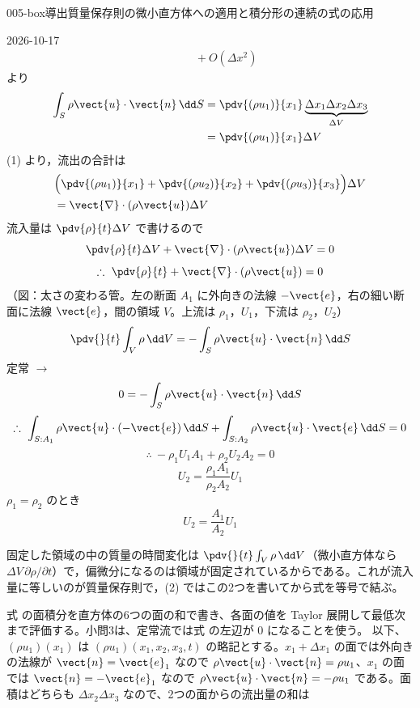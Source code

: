 \documentclass[uplatex,dvipdfmx,a4paper,11pt]{jsarticle}
\begin{document}
\begin{mondai}{005-box}{導出}{質量保存則の微小直方体への適用と積分形の連続の式の応用}
\begin{kotaeutsushi}{2026-10-17}
\begin{align*}
&\qquad+O(\Delta x^{2})
\end{align*}
より
\begin{align*}
\int_{S}\rho\vect{u}\cdot\vect{n}\,\dd S&=\pdv{(\rho u_{1})}{x_{1}}\underbrace{\Delta x_{1}\Delta x_{2}\Delta x_{3}}_{\Delta V}\\
&=\pdv{(\rho u_{1})}{x_{1}}\Delta V
\end{align*}
(1) より，流出の合計は
\begin{align*}
&\Bigl(\pdv{(\rho u_{1})}{x_{1}}+\pdv{(\rho u_{2})}{x_{2}}+\pdv{(\rho u_{3})}{x_{3}}\Bigr)\Delta V\\
&=\vect{\nabla}\cdot(\rho\vect{u})\Delta V
\end{align*}
流入量は $\pdv{\rho}{t}\Delta V$ で書けるので
\[ \pdv{\rho}{t}\Delta V+\vect{\nabla}\cdot(\rho\vect{u})\Delta V=0 \]
\[ \therefore\ \pdv{\rho}{t}+\vect{\nabla}\cdot(\rho\vect{u})=0 \]
（図：太さの変わる管。左の断面 $A_{1}$ に外向きの法線 $-\vect{e}$，右の細い断面に法線 $\vect{e}$，間の領域 $V$。上流は $\rho_{1}$，$U_{1}$，下流は $\rho_{2}$，$U_{2}$）
\[ \pdv{}{t}\int_{V}\rho\,\dd V=-\int_{S}\rho\vect{u}\cdot\vect{n}\,\dd S \]
定常 $\to$
\[ 0=-\int_{S}\rho\vect{u}\cdot\vect{n}\,\dd S \]
\[ \therefore\ \int_{S:A_{1}}\rho\vect{u}\cdot(-\vect{e})\,\dd S+\int_{S:A_{2}}\rho\vect{u}\cdot\vect{e}\,\dd S=0 \]
\[ \therefore\ -\rho_{1}U_{1}A_{1}+\rho_{2}U_{2}A_{2}=0 \]
\[ U_{2}=\frac{\rho_{1}A_{1}}{\rho_{2}A_{2}}U_{1} \]
$\rho_{1}=\rho_{2}$ のとき
\[ U_{2}=\frac{A_{1}}{A_{2}}U_{1} \]
\end{kotaeutsushi}
\begin{kizuki}
\item 固定した領域の中の質量の時間変化は $\pdv{}{t}\int_{V}\rho\,\dd V$（微小直方体なら $\Delta V\,\partial\rho/\partial t$）で，偏微分になるのは領域が固定されているからである。これが流入量に等しいのが質量保存則で，(2) ではこの2つを書いてから式を等号で結ぶ。
\end{kizuki}
\begin{tadashii}
\houshin 式  の面積分を直方体の6つの面の和で書き、各面の値を Taylor 展開して最低次まで評価する。小問3は、定常流では式  の左辺が 0 になることを使う。
\keisan {} 以下、$(\rho u_1)(x_1)$ は $(\rho u_1)(x_1, x_2, x_3, t)$ の略記とする。$x_1+\Delta x_1$ の面では外向きの法線が $\vect{n} = \vect{e}_1$ なので $\rho\vect{u}\cdot\vect{n} = \rho u_1$、$x_1$ の面では $\vect{n} = -\vect{e}_1$ なので $\rho\vect{u}\cdot\vect{n} = -\rho u_1$ である。面積はどちらも $\Delta x_2\Delta x_3$ なので、2つの面からの流出量の和は

\end{tadashii}
\end{mondai}
\end{document}
